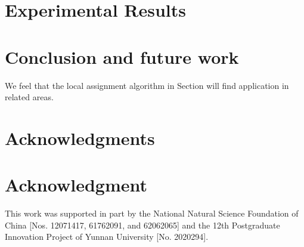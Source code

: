 \documentclass[journal]{IEEEtran}
\begin{document}
\section{Experimental Results}

\section{Conclusion and future work}
We feel that the local assignment algorithm in Section will find
application in related areas. 
\ifCLASSOPTIONcompsoc
\section*{Acknowledgments}
\else
\section*{Acknowledgment}
\fi

This work was supported in part by the National Natural
Science Foundation of China [Nos. 12071417, 61762091, and
62062065] and the 12th Postgraduate Innovation Project of
Yunnan University [No. 2020294].



\ifCLASSOPTIONcaptionsoff
\newpage
\fi




\ifCLASSOPTIONcaptionsoff
  \newpage
\fi





%
%
%


\end{document}
